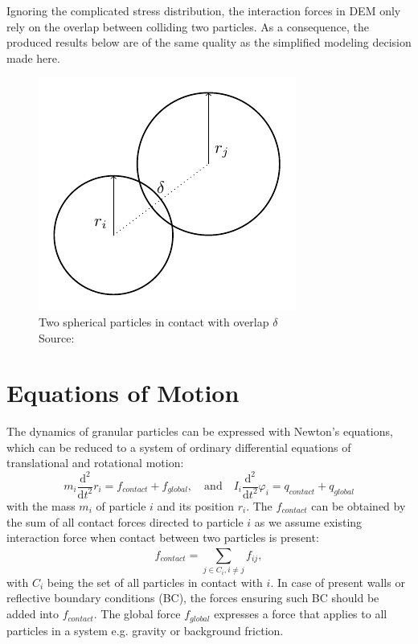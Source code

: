 \documentclass[11pt,
               a4paper,
               bibtotoc,
               idxtotoc,
               headsepline,
               footsepline,
               footexclude,
               BCOR12mm,
               DIV13,
               openany,   %
               ]
               {scrbook}
\begin{document}
Ignoring the complicated stress distribution, the interaction forces in DEM only rely on the overlap between colliding two particles. As a consequence, the produced results below are of the same quality as the simplified modeling decision made here. 

    \begin{figure}[H] %
	\centering
	\includegraphics[width=.3\columnwidth]{figures/discrete_spherical_particle_model.pdf}
	\caption[Example Figure]{Two spherical particles in contact with overlap $\delta$ \\
		\tiny{Source: \cite{Luding2008}}}
	\label{fig:discrete_spherical_particle_model} %
\end{figure}

\chapter{Equations of Motion}
The dynamics of granular particles can be expressed with Newton's equations, which can be reduced to a system of ordinary differential equations of translational and rotational  motion:
\begin{equation}
	m_i \frac{\mathrm{d}^2}{\mathrm{d}t^2} r_i = f_{contact} + f_{global}, \quad \text{and} \quad
	I_i \frac{\mathrm{d}^2}{\mathrm{d}t^2} \varphi_i = q_{contact} + q_{global}
\end{equation}
with the mass $m_i$  of particle $i$ and its position $r_i$. The $f_{contact}$ can be obtained by the sum of all contact forces directed to particle $i$ as we assume existing interaction force when contact between two particles is present:
\begin{equation}
f_{contact} = \sum_{j \in C_{i}, i \neq j}^{} f_{ij},
\end{equation}
with $C_i$ being the set of all particles in contact with $i$. In case of present walls or reflective boundary conditions (BC), the forces ensuring such BC should be added into $f_{contact}$.
The global force $f_{global}$ expresses a force that applies to all particles in a system e.g. gravity or background friction.
\end{document}
